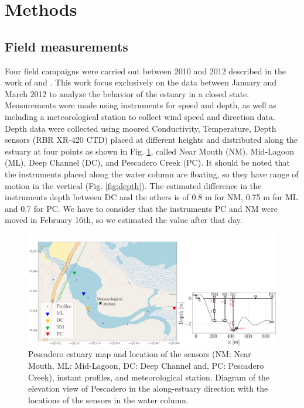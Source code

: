 \documentclass[tesis.tex]{subfiles}
\begin{document}
    
\section{Methods}

\subsection{Field measurements}

Four field campaigns were carried out between 2010 and 2012 described in the work of \cite{Williams2014} and \cite{williams2016}. This work focus exclusively on the data between January and March 2012 to analyze the behavior of the estuary in a closed state. Measurements were made using instruments for speed and depth, as well as including a meteorological station to collect wind speed and direction data. \\

Depth data were collected using moored Conductivity, Temperature, Depth sensors (RBR XR-420 CTD) placed at different heights and distributed along the estuary at four points as shown in Fig. \ref{fig:mapPDO}, called Near Mouth (NM), Mid-Lagoon (ML), Deep Channel (DC), and Pescadero Creek (PC). It should be noted that the instruments placed along the water column are floating, so they have range of motion in the vertical (Fig. \ref{fig:depth}). The estimated difference in the instruments depth between DC and the others is of 0.8 m for NM, 0.75 m for ML and 0.7 for PC. We have to consider that the instruments PC and NM were moved in February 16th, so we estimated the value after that day.\\


\begin{figure}[h!]
    \centering
    \includegraphics[width=\textwidth]{Imagenes/mapa3.png}
    \caption{Pescadero estuary map and location of the sensors (NM: Near Mouth, ML: Mid-Lagoon, DC: Deep Channel and, PC: Pescadero Creek), instant profiles, and meteorological station. Diagram of the elevation view of Pescadero in the along-estuary direction with the locations of the sensors in the water column.}
    \label{fig:mapPDO}
\end{figure}
\end{document}
